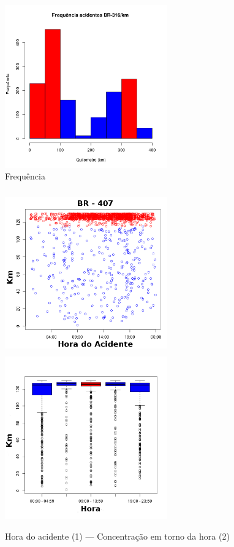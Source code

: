 \quad \quad
\begin{figure}[h]
	\centering
	\caption{ Frequência}
	\includegraphics[width=7cm,height=7cm]{Figuras/Preprocess/br316_3.png}
\end{figure}


\pagebreak

\begin{figure}[h]
	\caption{Hora do acidente (1) --- Concentração em torno da hora (2)}
	\includegraphics[width=7cm,height=7cm]{Figuras/Preprocess/br407_1.png}
	\includegraphics[width=7cm,height=7cm]{Figuras/Preprocess/br407_3.png}

\end{figure}

